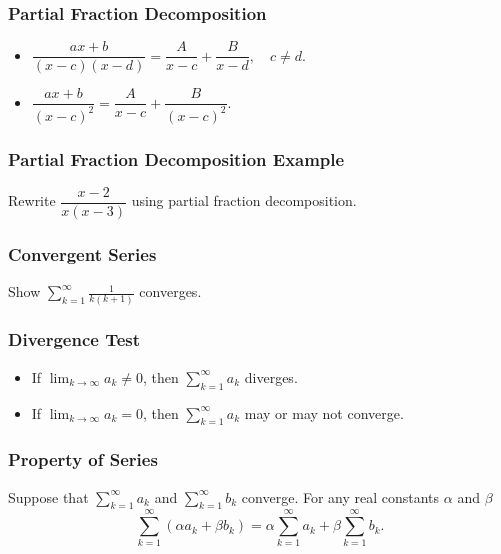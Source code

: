 \documentclass{beamer}
\begin{document}
  \begin{frame}
  \frametitle{Partial Fraction Decomposition}
\begin{itemize}
\item $\dfrac{a x + b}{(x - c)(x - d)} = \dfrac{A}{x - c} + \dfrac{B}{x - d},\quad c \neq d.$
\item $\dfrac{ax + b}{(x - c)^2} = \dfrac{A}{x - c} + \dfrac{B}{(x - c)^2}.$
\end{itemize}
  \end{frame}
  
 \begin{frame}[t]
 \frametitle{Partial Fraction Decomposition Example}
 \begin{Example}
Rewrite $\dfrac{x - 2}{x(x - 3)}$ using partial fraction decomposition.
 \end{Example}

  \end{frame}
  
  \begin{frame}[t]
   \frametitle{Convergent Series}
   \begin{Example}
   Show $\displaystyle\sum_{k = 1}^\infty \frac{1}{k(k + 1)}$ converges. 
   \end{Example}
  
  \end{frame}
 
 \begin{frame}
 \frametitle{Divergence Test}
 \begin{itemize}
\item If $\displaystyle\lim_{k\to\infty} a_k \neq 0$, then $\displaystyle\sum_{k = 1}^\infty a_k$ diverges.  
\item If $\displaystyle\lim_{k\to\infty} a_k =  0$, then $\displaystyle\sum_{k = 1}^\infty a_k$ may or may not converge.
\end{itemize}
 \end{frame}
 
 \begin{frame}
 \frametitle{Property of Series}
 
 \begin{Theorem} 
 Suppose that $\displaystyle\sum_{k = 1}^\infty a_k$ and $\displaystyle\sum_{k = 1}^\infty b_k$ converge. For any real constants $\alpha$ and $\beta$
 $$
 \sum_{k = 1}^\infty\left( \alpha a_k + \beta b_k\right) =   \alpha \sum_{k = 1}^\infty a_k + \beta \sum_{k = 1}^\infty b_k .
 $$
  \end{Theorem} 
 \end{frame}
 
\end{document}
